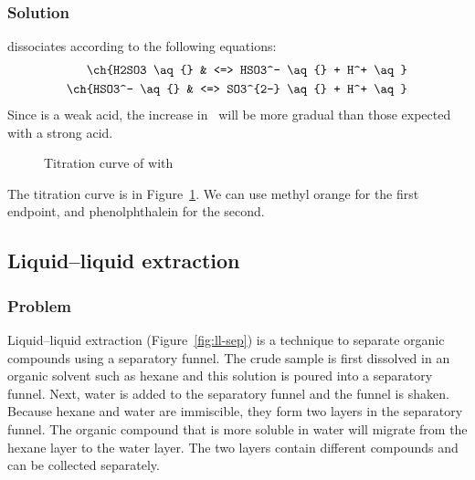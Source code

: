 \subsubsection{Solution}
 dissociates according to the following equations:
\begin{align*}
	\ch{H2SO3 \aq{}  & <=> HSO3^- \aq{} + H^+ \aq}   \\
	\ch{HSO3^- \aq{} & <=> SO3^{2-} \aq{} + H^+ \aq}
\end{align*}
Since  is a weak acid, the increase in \pH\ will be more gradual
than those expected with a strong acid.
\begin{figure}[htpb]
	\centering
	\caption{Titration curve of  with }
	\label{fig:titration-h2so3}
\end{figure}

The titration curve is in Figure~\ref{fig:titration-h2so3}. We can use {\color{accent}
		methyl orange} for the first endpoint, and {\color{accent} phenolphthalein} for the second.

\subsection{Liquid--liquid extraction}
\subsubsection{Problem}
Liquid--liquid extraction (Figure~\ref{fig:ll-sep}) is a technique to separate
organic compounds using a separatory funnel. The crude sample is first dissolved
in an organic solvent such as hexane and this solution is poured into a separatory funnel.
Next, water is added to the separatory funnel and the funnel is shaken.
Because hexane and water are immiscible, they form two layers in the
separatory funnel. The organic compound that is more soluble in water will migrate
from the hexane layer to the water layer. The two layers contain different
compounds and can be collected separately.

